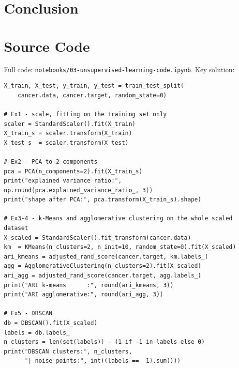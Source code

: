 \documentclass[11pt,a4paper]{article}
\begin{document}
\section{Conclusion}



\appendix
\section{Source Code}
Full code: \texttt{notebooks/03-unsupervised-learning-code.ipynb}. Key solution:

\begin{lstlisting}[caption={Reference solution for Exercises 1--5.}]
X_train, X_test, y_train, y_test = train_test_split(
    cancer.data, cancer.target, random_state=0)

# Ex1 - scale, fitting on the training set only
scaler = StandardScaler().fit(X_train)
X_train_s = scaler.transform(X_train)
X_test_s  = scaler.transform(X_test)

# Ex2 - PCA to 2 components
pca = PCA(n_components=2).fit(X_train_s)
print("explained variance ratio:", np.round(pca.explained_variance_ratio_, 3))
print("shape after PCA:", pca.transform(X_train_s).shape)

# Ex3-4 - k-Means and agglomerative clustering on the whole scaled dataset
X_scaled = StandardScaler().fit_transform(cancer.data)
km  = KMeans(n_clusters=2, n_init=10, random_state=0).fit(X_scaled)
ari_kmeans = adjusted_rand_score(cancer.target, km.labels_)
agg = AgglomerativeClustering(n_clusters=2).fit(X_scaled)
ari_agg = adjusted_rand_score(cancer.target, agg.labels_)
print("ARI k-means      :", round(ari_kmeans, 3))
print("ARI agglomerative:", round(ari_agg, 3))

# Ex5 - DBSCAN
db = DBSCAN().fit(X_scaled)
labels = db.labels_
n_clusters = len(set(labels)) - (1 if -1 in labels else 0)
print("DBSCAN clusters:", n_clusters,
      "| noise points:", int((labels == -1).sum()))
\end{lstlisting}
\end{document}

